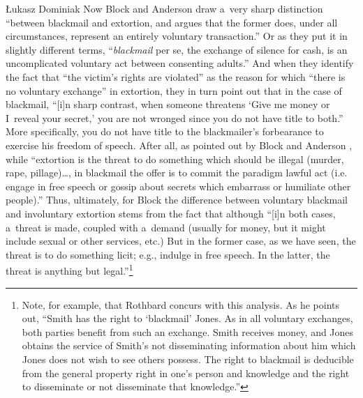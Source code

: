 \begin{artengenv}{Łukasz Dominiak}
Now Block and Anderson 
\parencite*[][p.544]{block_blackmail_2000} %
 draw a~very sharp distinction ``between blackmail and extortion, and argues that the former does, under all circumstances, represent an entirely voluntary transaction.'' Or as they 
\parencite*[][p.560]{block_blackmail_2000} %
 put it in slightly different terms, ``\textit{blackmail} per se, the exchange of silence for cash, is an uncomplicated voluntary act between consenting adults.'' And when they 
\parencite*[][p.546]{block_blackmail_2000} %
 identify the fact that ``the victim's rights are violated'' as the reason for which ``there is no voluntary exchange'' in extortion, they 
\parencite*[][p.546]{block_blackmail_2000} %
 in turn point out that in the case of blackmail, ``[i]n sharp contrast, when someone threatens ‘Give me money or I~reveal your secret,' you are not wronged since you do not have title to both.'' More specifically, you do not have title to the blackmailer's forbearance to exercise his freedom of speech. After all, as pointed out by Block and Anderson 
\parencite*[][p.546]{block_blackmail_2000}, %
 while ``extortion is the threat to do something which should be illegal (murder, rape, pillage)…, in blackmail the offer is to commit the paradigm lawful act (i.e. engage in free speech or gossip about secrets which embarrass or humiliate other people).'' Thus, ultimately, for Block 
\parencite*[][p.281]{block_libertarian_1998} %
 the difference between voluntary blackmail and involuntary extortion stems from the fact that although ``[i]n both cases, a~threat is made, coupled with a~demand (usually for money, but it might include sexual or other services, etc.) But in the former case, as we have seen, the threat is to do something licit; e.g., indulge in free speech. In the latter, the threat is anything but legal.''\footnote{Note, for example, that Rothbard concurs with this analysis. As he 
\parencite*[][p.124]{rothbard_ethics_1998} %
 points out, ``Smith has the right to ‘blackmail' Jones. As in all voluntary exchanges, both parties benefit from such an exchange. Smith receives money, and Jones obtains the service of Smith's not disseminating information about him which Jones does not wish to see others possess. The right to blackmail is deducible from the general property right in one's person and knowledge and the right to disseminate or not disseminate that knowledge.''}




\end{artengenv}
